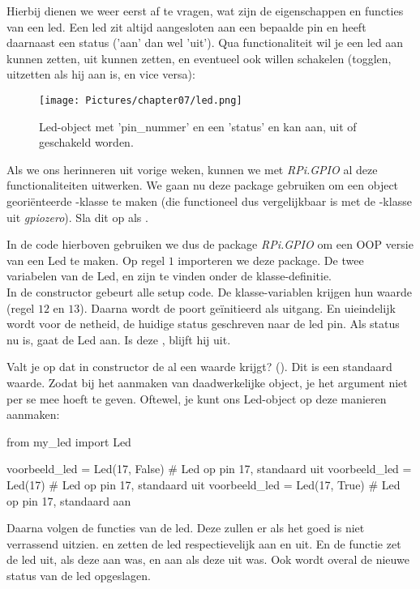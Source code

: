 Hierbij dienen we weer eerst af te vragen, wat zijn de eigenschappen en functies van een led. Een led zit altijd aangesloten aan een bepaalde pin en heeft daarnaast een status ('aan' dan wel 'uit'). Qua functionaliteit wil je een led aan kunnen zetten, uit kunnen zetten, en eventueel ook willen schakelen (togglen, uitzetten als hij aan is, en vice versa): 

\begin{figure}[h!]
\centering\texttt{[image: Pictures/chapter07/led.png]}
\caption{Led-object met 'pin\_nummer' en een 'status' en kan aan, uit of geschakeld worden.}
\label{fig:led} %
\end{figure}

Als we ons herinneren uit vorige weken, kunnen we met \textit{RPi.GPIO} al deze functionaliteiten uitwerken. We gaan nu deze package gebruiken om een object georiënteerde -klasse te maken (die functioneel dus vergelijkbaar is met de -klasse uit \textit{gpiozero}). Sla dit op als .


In de code hierboven gebruiken we dus de package \textit{RPi.GPIO} om een OOP versie van een Led te maken. Op regel $1$ importeren we deze package. De twee variabelen van de Led,  en  zijn te vinden onder de klasse-definitie. \\
In de constructor gebeurt alle setup code. De klasse-variablen krijgen hun waarde (regel $12$ en $13$). Daarna wordt de poort geïnitieerd als uitgang. En uieindelijk wordt voor de netheid, de huidige status geschreven naar de led pin. Als status nu  is, gaat de Led aan. Is deze , blijft hij uit.
\begin{remark}
Valt je op dat in constructor de  al een waarde krijgt? (). Dit is een standaard waarde. Zodat bij het aanmaken van daadwerkelijke object, je het argument  niet per se mee hoeft te geven. Oftewel, je kunt ons Led-object op deze manieren aanmaken:
\begin{python}
from my_led import Led

voorbeeld_led = Led(17, False)  # Led op pin 17, standaard uit  
voorbeeld_led = Led(17)         # Led op pin 17, standaard uit  
voorbeeld_led = Led(17, True)   # Led op pin 17, standaard aan  
\end{python}
\end{remark}
Daarna volgen de functies van de led. Deze zullen er als het goed is niet verrassend uitzien.  en  zetten de led respectievelijk aan en uit. En de  functie zet de led uit, als deze aan was, en aan als deze uit was. Ook wordt overal de nieuwe status van de led opgeslagen. \\

